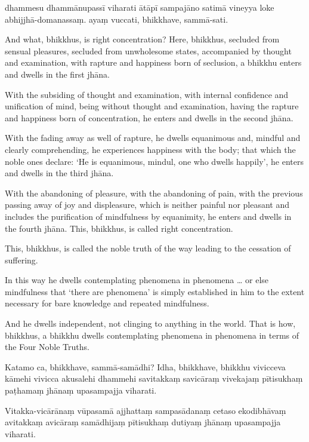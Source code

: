 dhammesu dhammānupassī viharati ātāpī sampajāno satimā vineyya loke
abhijjhā-domanassaṃ. ayaṃ vuccati, bhikkhave, sammā-sati.

\englishPage

And what, bhikkhus, is right concentration? Here, bhikkhus, secluded from
sensual pleasures, secluded from unwholesome states, accompanied by thought and
examination, with rapture and happiness born of seclusion, a bhikkhu enters and
dwells in the first jhāna.

With the subsiding of thought and examination, with internal confidence and
unification of mind, being without thought and examination, having the rapture
and happiness born of concentration, he enters and dwells in the second jhāna.

With the fading away as well of rapture, he dwells equanimous and, mindful and
clearly comprehending, he experiences happiness with the body; that which the
noble ones declare: `He is equanimous, mindul, one who dwells happily', he
enters and dwells in the third jhāna.

With the abandoning of pleasure, with the abandoning of pain, with the previous
passing away of joy and displeasure, which is neither painful nor pleasant and
includes the purification of mindfulness by equanimity, he enters and dwells in
the fourth jhāna. This, bhikkhus, is called right concentration.

This, bhikkhus, is called the noble truth of the way leading to the cessation of
suffering.

In this way he dwells contemplating phenomena in phenomena \ldots{} or else
mindfulness that ‘there are phenomena’ is simply established in him to the
extent necessary for bare knowledge and repeated mindfulness.

And he dwells independent, not clinging to anything in the world. That is how,
bhikkhus, a bhikkhu dwells contemplating phenomena in phenomena in terms of the
Four Noble Truths.



\paliPage

Katamo ca, bhikkhave, sammā-samādhi? Idha, bhikkhave, bhikkhu vivicceva kāmehi
vivicca akusalehi dhammehi savitakkaṃ savicāraṃ vivekajaṃ pītisukhaṃ paṭhamaṃ
jhānaṃ upasampajja viharati.

Vitakka-vicārānaṃ vūpasamā ajjhattaṃ sampasādanaṃ cetaso ekodibhāvaṃ avitakkaṃ
avicāraṃ samādhijaṃ pītisukhaṃ dutiyaṃ jhānaṃ upasampajja viharati.

